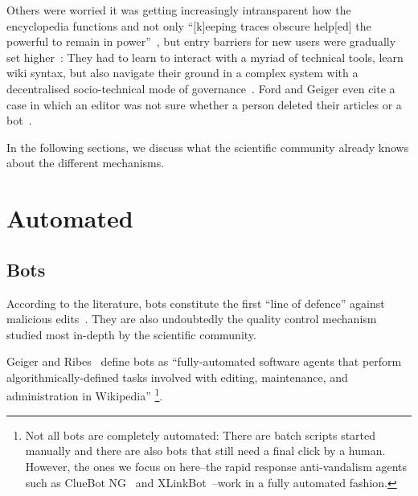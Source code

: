 Others were worried it was getting increasingly intransparent how the encyclopedia functions and not only ``[k]eeping traces obscure help[ed] the powerful to remain in power''~\cite{ForGei2012},
but entry barriers for new users were gradually set higher~\cite{HalGeiMorRied2013}:
They had to learn to interact with a myriad of technical tools, learn wiki syntax, but also navigate their ground in a complex system with a decentralised socio-technical mode of governance~\cite{Geiger2017}.
Ford and Geiger even cite a case in which an editor was not sure whether a person deleted their articles or a bot~\cite{ForGei2012}.

In the following sections, we discuss what the scientific community already knows about the different mechanisms.

\section{Automated}

\subsection{Bots}
\label{section:bots}
According to the literature, bots constitute the first ``line of defence'' against malicious edits~\cite{GeiHal2013}.
They are also undoubtedly the quality control mechanism studied most in-depth by the scientific community.

Geiger and Ribes~\cite{GeiRib2010} define bots as
``fully-automated software
agents that perform algorithmically-defined tasks involved
with editing, maintenance, and administration in Wikipedia''
\footnote{Not all bots are completely automated:
There are batch scripts started manually and there are also bots that still need a final click by a human.
However, the ones we focus on here–the rapid response anti-vandalism agents such as ClueBot NG~\cite{Wikipedia:ClueBotNG} and XLinkBot~\cite{Wikipedia:XLinkBot}–work in a fully automated fashion.}.

